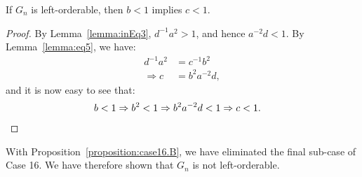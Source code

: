 \begin{lemma} If $G_n$ is left-orderable, then $b<1$ implies $c<1$.
\label{genImp1}
\end{lemma}
\begin{proof}By Lemma~\ref{lemma:inEq3}, $d^{-1}a^{2}>1$, and hence $a^{-2}d<1$. By Lemma~\ref{lemma:eq5}, we have:
\begin{align*}
d^{-1}a^{2}&=c^{-1}b^{2}\\
\Rightarrow{}c&=b^{2}a^{-2}d,
\end{align*}
and it is now easy to see that:
\begin{align*}
b<1\Rightarrow{}b^{2}<1\Rightarrow{}b^{2}a^{-2}d&<1\Rightarrow{}c<1.\qedhere
\end{align*}
\end{proof}








\noindent{}With Proposition~\ref{proposition:case16.B}, we have eliminated the final sub-case of Case 16. We have therefore shown that $G_n$ is not left-orderable.


